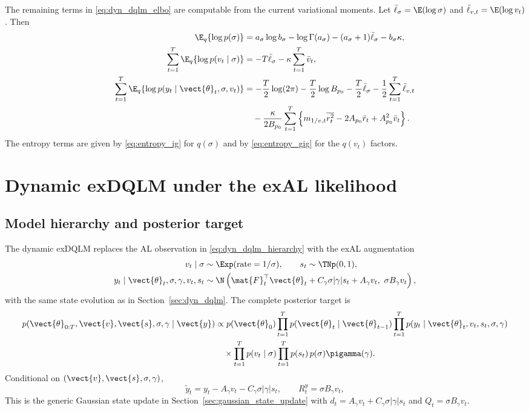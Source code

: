 The remaining terms in \eqref{eq:dyn_dqlm_elbo} are computable from the
current variational moments. Let
$\bar\ell_\sigma=\E(\log\sigma)$ and
$\bar\ell_{v,t}=\E(\log v_t)$. Then
\begin{align}
\E_q\{\log p(\sigma)\}
&=
a_\sigma\log b_\sigma-\log\Gamma(a_\sigma)
-(a_\sigma+1)\bar\ell_\sigma-b_\sigma\kappa,\\
\sum_{t=1}^T\E_q\{\log p(v_t\mid\sigma)\}
&=
-T\bar\ell_\sigma-\kappa\sum_{t=1}^T\bar v_t,\\
\sum_{t=1}^T\E_q\{\log p(y_t\mid\vect{\theta}_t,\sigma,v_t)\}
&=
-\frac{T}{2}\log(2\pi)-\frac{T}{2}\log B_{p_0}
-\frac{T}{2}\bar\ell_\sigma
-\frac{1}{2}\sum_{t=1}^T\bar\ell_{v,t}\nonumber\\
&\quad
-\frac{\kappa}{2B_{p_0}}\sum_{t=1}^T
\left\{m_{1/v,t}\overline{r_t^2}-2A_{p_0}\bar r_t+A_{p_0}^2\bar v_t\right\}.
\label{eq:dyn_dqlm_elbo_terms}
\end{align}
The entropy terms are given by \eqref{eq:entropy_ig} for $q(\sigma)$ and by
\eqref{eq:entropy_gig} for the $q(v_t)$ factors.

\section{Dynamic exDQLM under the exAL likelihood}
\label{sec:dyn_exdqlm}

\subsection{Model hierarchy and posterior target}

The dynamic exDQLM replaces the AL observation in
\eqref{eq:dyn_dqlm_hierarchy} with the exAL augmentation
\begin{align}
v_t\mid\sigma &\sim \Exp(\text{rate}=1/\sigma), \qquad
s_t\sim\TNp(0,1), \\
y_t\mid\vect{\theta}_t,\sigma,\gamma,v_t,s_t
&\sim
\N\left(
\mat{F}_t^\top\vect{\theta}_t+C_\gamma\sigma|\gamma|s_t+A_\gamma v_t,\
\sigma B_\gamma v_t
\right),
\label{eq:dyn_exdqlm_obs}
\end{align}
with the same state evolution as in Section~\ref{sec:dyn_dqlm}. The complete
posterior target is
\begin{align}
p(\vect{\theta}_{0:T},\vect{v},\vect{s},\sigma,\gamma\mid\vect{y})
&\propto
p(\vect{\theta}_0)\prod_{t=1}^Tp(\vect{\theta}_t\mid\vect{\theta}_{t-1})
\prod_{t=1}^Tp(y_t\mid\vect{\theta}_t,v_t,s_t,\sigma,\gamma) \nonumber\\
&\quad\times
\prod_{t=1}^Tp(v_t\mid\sigma)\prod_{t=1}^Tp(s_t)\,p(\sigma)\pigamma(\gamma).
\label{eq:dyn_exdqlm_joint}
\end{align}
Conditional on $(\vect{v},\vect{s},\sigma,\gamma)$,
\begin{equation}
\tilde y_t=y_t-A_\gamma v_t-C_\gamma\sigma|\gamma|s_t,\qquad
R^y_t=\sigma B_\gamma v_t,
\label{eq:dyn_exdqlm_pseudo}
\end{equation}
This is the generic Gaussian state update in
Section~\ref{sec:gaussian_state_update} with
$d_t=A_\gamma v_t+C_\gamma\sigma|\gamma|s_t$ and
$Q_t=\sigma B_\gamma v_t$.

